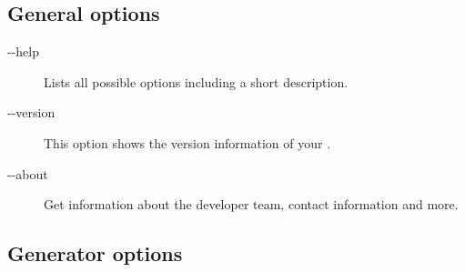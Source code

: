 \subsection{General options}
\begin{description}
	\item [-{}-help] Lists all possible options including a short description.
	\item [-{}-version] This option shows the version information of your \RSS.
	\item [-{}-about] Get information about the developer team, contact information and more.
\end{description}

\subsection{Generator options}

